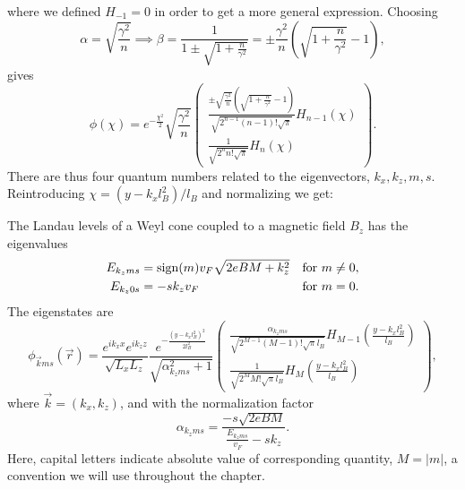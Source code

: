 where we defined \( H_{-1} = 0 \) in order to get a more general expression.
Choosing
\begin{equation}
  \alpha  = \sqrt{\frac{\gamma^2}{n}} \implies \beta = \frac{1}{1 \pm \sqrt{1 + \frac{n}{\gamma ^2}}} = \pm \frac{\gamma ^2}{n} \left( \sqrt{1 + \frac{n}{\gamma ^2}} - 1 \right),
\end{equation}
gives
\begin{equation}
  \phi (\chi ) = e^{-\frac{\chi^2}{2}} \sqrt{\frac{\gamma ^2}{n}}
  \begin{pmatrix}
    \frac{
      \pm \sqrt{\frac{\gamma ^2}{n}} \left( \sqrt{1 + \frac{n}{\gamma ^2}} - 1 \right)
    }{
      \sqrt{2^{n-1} (n-1)! \sqrt{\pi }}
    }
    H_{n-1}(\chi )\\
    \frac{1}{\sqrt{2^{n}n!\sqrt{\pi }}} H_n \left(\chi \right)
  \end{pmatrix}.
\end{equation}
There are thus four quantum numbers related to the eigenvectors, $k_x,  k_z, m, s$.
Reintroducing $\chi = (y-k_xl_B^2) /l_B$ and normalizing we get:
\begin{summary}
  The Landau levels of a Weyl cone coupled to a magnetic field \( B_z \) has the eigenvalues
  \begin{subequations}
    \begin{align}
      E_{k_z m s} &= \operatorname{sign}(m) v_F \sqrt{2 e B M + k_{z} ^2} &\text{for } m \neq 0,\\
      E_{k_z 0 s} &= - sk_z v_F &\text{for } m = 0.
    \end{align}
  \end{subequations}
  The eigenstates are
  \begin{equation}
    \phi _{\vec{k} m s}(\vec{r}) =
    \frac{e^{ik_x x}e^{ik_z z}}{\sqrt{L_xL_z}}
    \frac{e^{-\frac{\left(y-k_x l_B^2\right)^2}{2 l_B^2}}}{\sqrt{\alpha_{k_z m s}^2 + 1}}
    \begin{pmatrix}
      \frac{\alpha_{k_z m s}}{\sqrt{2^{M-1} (M-1)! \sqrt{\pi } l_B}} H_{M-1}\left( \frac{y-k_x l_B^2}{l_B} \right)\\
      \frac{1}{\sqrt{2^M M! \sqrt{\pi } l_B}} H_M \left( \frac{y-k_x l_B^2}{l_B} \right)
    \end{pmatrix},
  \end{equation}
  where \( \vec{k} = (k_x, k_z)\), and with the normalization factor
  \begin{equation}
    \alpha_{k_z m s} = \frac{-s \sqrt{2eB M}}{\frac{E_{k_z m s}}{v_{F}} - s k_z}.
  \end{equation}
  Here, capital letters indicate absolute value of corresponding quantity, \( M=|m| \), a convention we will use throughout the chapter.
\end{summary}
